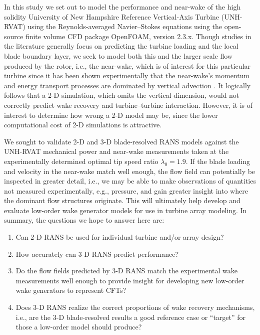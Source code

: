 \documentclass[aip,graphicx]{revtex4-1}
\begin{document}
In this study we set out to model the performance and near-wake of the high
solidity University of New Hampshire Reference Vertical-Axis Turbine (UNH-RVAT)
using the Reynolds-averaged Navier--Stokes equations using the open-source
finite volume CFD package OpenFOAM, version 2.3.x. Though studies in the
literature generally focus on predicting the turbine loading and the local blade
boundary layer, we seek to model both this and the larger scale flow produced by
the rotor, i.e., the near-wake, which is of interest for this particular turbine
since it has been shown experimentally that the near-wake's momentum and energy
transport processes are dominated by vertical advection \cite{Bachant2015-JoT}.
It logically follows that a 2-D simulation, which omits the vertical dimension,
would not correctly predict wake recovery and turbine--turbine interaction.
However, it is of interest to determine how wrong a 2-D model may be, since the
lower computational cost of 2-D simulations is attractive.

We sought to validate 2-D and 3-D blade-resolved RANS models against the
UNH-RVAT mechanical power and near-wake measurements taken at the experimentally
determined optimal tip speed ratio $\lambda_0 = 1.9$. If the blade loading and
velocity in the near-wake match well enough, the flow field can potentially be
inspected in greater detail, i.e., we may be able to make observations of
quantities not measured experimentally, e.g., pressure, and gain greater insight
into where the dominant flow structures originate. This will ultimately help
develop and evaluate low-order wake generator models for use in turbine array
modeling. In summary, the questions we hope to answer here are:

\begin{enumerate}
    \item Can 2-D RANS be used for individual turbine and/or array design?

    \item How accurately can 3-D RANS predict performance?

    \item Do the flow fields predicted by 3-D RANS match the experimental wake
    measurements well enough to provide insight for developing new low-order
    wake generators to represent CFTs?

    \item Does 3-D RANS realize the correct proportions of wake recovery
    mechanisms, i.e., are the 3-D blade-resolved results a good reference case
    or ``target'' for those a low-order model should produce?
\end{enumerate}
\end{document}

